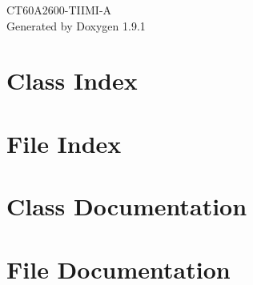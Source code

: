 \let\mypdfximage\pdfximage\def\pdfximage{\immediate\mypdfximage}\documentclass[twoside]{book}
\newcommand{\+}{\discretionary{\mbox{\scriptsize$\hookleftarrow$}}{}{}}
\newcommand{\clearemptydoublepage}{%
  \newpage{\pagestyle{empty}\cleardoublepage}%
}
\begin{document}
\raggedbottom

\hypersetup{pageanchor=false,
             bookmarksnumbered=true,
             pdfencoding=unicode
            }
\begin{titlepage}
\vspace*{7cm}
\begin{center}%
{\Large CT60\+A2600-\/\+TIIMI-\/A }\\
\vspace*{1cm}
{\large Generated by Doxygen 1.9.1}\\
\end{center}
\end{titlepage}
\clearemptydoublepage
{}
\tableofcontents
\clearemptydoublepage
{}
\hypersetup{pageanchor=true}

\chapter{Class Index}

\chapter{File Index}

\chapter{Class Documentation}




\chapter{File Documentation}











\backmatter
\newpage
{}
\clearemptydoublepage
{}
\printindex
\end{document}
